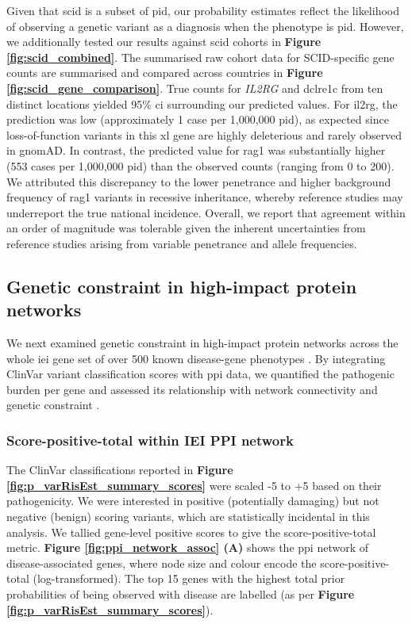 Given that \ac{scid} is a subset of \ac{pid}, our probability estimates reflect the likelihood of observing a genetic variant as a diagnosis when the phenotype is \ac{pid}. 
However, we additionally tested our results against \ac{scid} cohorts in 
 \textbf{Figure \ref{fig:scid_combined}}.
The summarised raw cohort data for SCID-specific gene counts are summarised and compared across countries in \textbf{Figure \ref{fig:scid_gene_comparison}}.
True counts for \textit{IL2RG} and \ac{dclre1c} from ten distinct locations yielded 95\% \ac{ci} surrounding our predicted values. 
For \ac{il2rg}, the prediction was low (approximately 1 case per 1,000,000 \ac{pid}), as expected since loss-of-function variants in this \ac{xl} gene are highly deleterious and rarely observed in gnomAD. In contrast, the predicted value for \ac{rag1} was substantially higher (553 cases per 1,000,000 \ac{pid}) than the observed counts (ranging from 0 to 200). 
We attributed this discrepancy to the lower penetrance and higher background frequency of \ac{rag1} variants in recessive inheritance, whereby reference studies may underreport the true national incidence. 
Overall, we report that agreement within an order of magnitude was tolerable given the inherent uncertainties from reference studies arising from variable penetrance and allele frequencies.

\FloatBarrier
\subsection{Genetic constraint in high-impact protein networks}

We next examined genetic constraint in high-impact protein networks across the whole \ac{iei} gene set of over 500 known disease-gene phenotypes \cite{poli_human_2025}. By integrating ClinVar variant classification scores with \ac{ppi} data, we quantified the pathogenic burden per gene and assessed its relationship with network connectivity and genetic constraint
\cite{szklarczyk2025string, karczewski2020mutational}.

\subsubsection{Score-positive-total within IEI PPI network}

The ClinVar classifications reported in 
\textbf{Figure \ref{fig:p_varRisEst_summary_scores}} were scaled -5 to +5 based on their pathogenicity. 
We were interested in positive (potentially damaging) but not negative (benign) scoring variants, which are statistically incidental in this analysis. 
We tallied gene-level positive scores to give the score-positive-total metric. 
\textbf{Figure \ref{fig:ppi_network_assoc} (A)} shows the \ac{ppi} network of disease-associated genes, where node size and colour encode the score-positive-total (log-transformed). 
The top 15 genes with the highest total prior probabilities of being observed with disease are labelled (as per \textbf{Figure \ref{fig:p_varRisEst_summary_scores}}).



